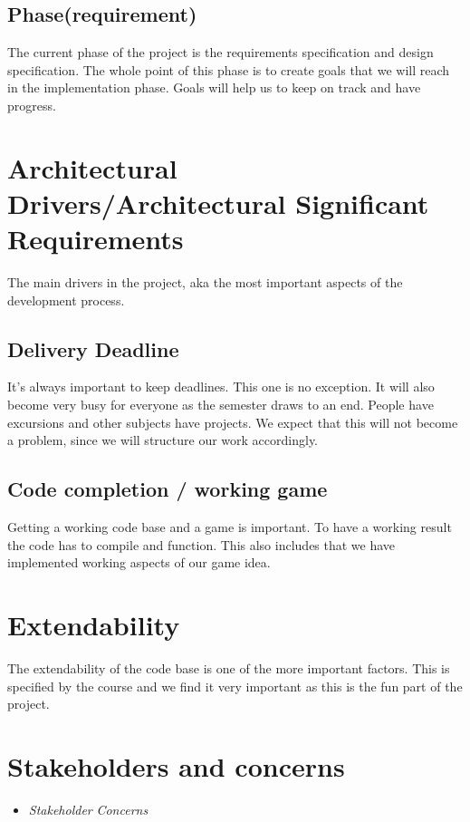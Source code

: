 \documentclass[12pt, a4paper]{article}
\begin{document}
\subsection{Phase(requirement)}
The current phase of the project is the requirements specification and design specification. The whole point of this phase is to create goals that we will reach in the implementation phase. Goals will help us to keep on track and have progress. 


\section{Architectural Drivers/Architectural Significant Requirements}

The main drivers in the project, aka the most important aspects of the development process. 

\subsection{Delivery Deadline}
It’s always important to keep deadlines. This one is no exception. It will also become very busy for everyone as the semester draws to an end. People have excursions and other subjects have projects. We expect that this will not become a problem, since we will structure our work accordingly.

\subsection{Code completion / working game}

Getting a working code base and a game is important. To have a working result the code has to compile and function. This also includes that we have implemented working aspects of our game idea. 

\section{Extendability}

The extendability of the code base is one of the more important factors. This is specified by the course and we find it very important as this is the fun part of the project. 

\section{Stakeholders and concerns}
\begin{itemize}
	\item \textit{Stakeholder}
	\subitem \textit{Concerns}
\end{itemize}
\end{document}
